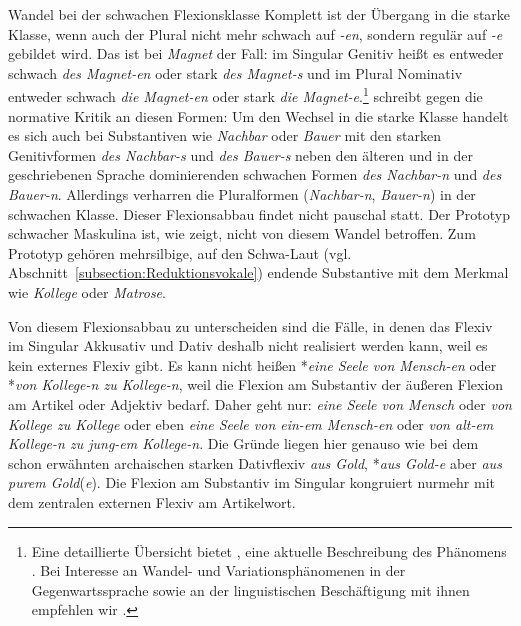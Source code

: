 \begin{Exkurs}{Wandel bei der schwachen Flexionsklasse}
Komplett ist der Übergang in die starke Klasse, wenn auch der Plural nicht mehr schwach auf \textit{-en}, sondern regulär auf \textit{-e} gebildet wird. Das ist bei \textit{Magnet} der Fall: im Singular Genitiv heißt es entweder schwach \textit{des Magnet-en} oder stark \textit{des Magnet-s} und im Plural Nominativ entweder schwach \textit{die Magnet-en} oder stark \textit{die Magnet-e}.\footnote{Eine detaillierte Übersicht bietet \citet[38--49]{Paul1986_1917_Fx}, eine aktuelle Beschreibung des Phänomens \citet{Thieroff2003}. Bei Interesse an Wandel- und Variationsphänomenen in der Gegenwartssprache sowie an der linguistischen Beschäftigung mit ihnen empfehlen wir \citet{Freywald_al_2023}.} \citet[114]{Thieroff2003} schreibt gegen die normative Kritik an diesen Formen:  Um den Wechsel in die starke Klasse handelt es sich auch bei Substantiven wie \textit{Nachbar} oder \textit{Bauer} mit den starken Genitivformen \textit{des Nachbar-s} und \textit{des Bauer-s} neben den älteren und in der geschriebenen Sprache dominierenden schwachen Formen \textit{des Nachbar-n} und \textit{des Bauer-n}. Allerdings verharren die Pluralformen (\textit{Nachbar-n}, \textit{Bauer-n}) in der schwachen Klasse. Dieser Flexionsabbau findet nicht pauschal statt. Der Prototyp schwacher Maskulina ist, wie \citet[71]{Koepcke2005} zeigt, nicht von diesem Wandel betroffen. Zum Prototyp gehören mehrsilbige, auf den Schwa-Laut (vgl. Abschnitt~\ref{subsection:Reduktionsvokale}) endende Substantive mit dem Merkmal  wie \textit{Kollege} oder \textit{Matrose}.

Von diesem Flexionsabbau zu unterscheiden sind die Fälle, in denen das Flexiv im Singular Akkusativ und Dativ deshalb nicht realisiert werden kann, weil es kein externes Flexiv gibt. Es kann nicht heißen *\textit{eine Seele von Mensch-en} oder *\textit{von Kollege-n zu Kollege-n}, weil die Flexion am Substantiv der äußeren Flexion am Artikel oder Adjektiv bedarf. Daher geht nur: \textit{eine Seele von Mensch} oder \textit{von Kollege zu Kollege} oder eben \textit{eine Seele von ein-em Mensch-en} oder \textit{von alt-em Kollege-n zu jung-em Kollege-n}. Die Gründe liegen hier genauso wie bei dem schon erwähnten archaischen starken Dativflexiv \textit{aus Gold}, *\textit{aus Gold-e} aber \textit{aus purem Gold}(\textit{e}). Die Flexion am Substantiv im Singular kongruiert nurmehr mit dem zentralen externen Flexiv am Artikelwort. 


\end{Exkurs}
